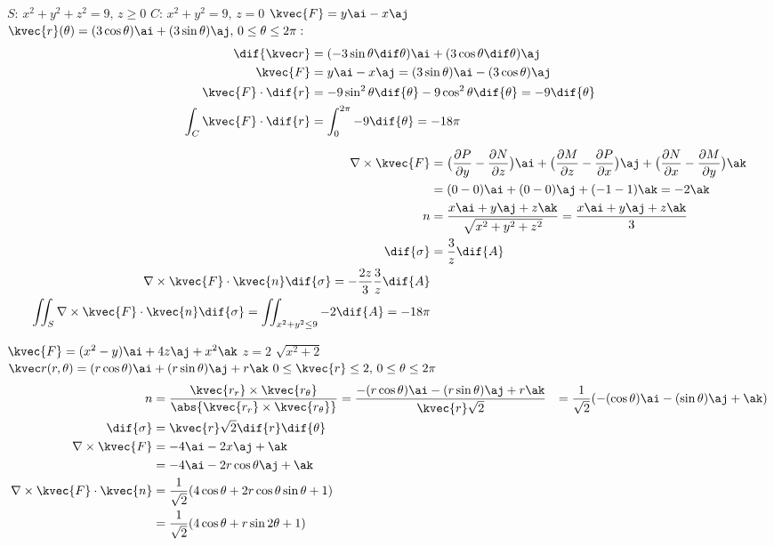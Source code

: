 \(S:\,x^{2}+y^{2}+z^{2}=9,\,z\ge 0\)
\(C:\,x^{2}+y^{2}=9,\,z=0\)
\(\kvec{F}=y\ai-x\aj\)\\
\(\kvec{r}(\theta)=(3\cos \theta)\ai+(3\sin \theta)\aj,\,0\le \theta\le 2\pi:\)\\

\begin{align*}
\dif{\kvec r}&=(-3\sin \theta\dif\theta)\ai+(3\cos \theta\dif\theta)\aj\\
\kvec{F}&=y\ai-x\aj=(3\sin \theta)\ai-(3\cos \theta)\aj\\
\kvec{F}\cdot\dif{r}&=-9\sin ^{2}\theta\dif{\theta}-9\cos ^{2}\theta\dif{\theta}=-9\dif{\theta}\\
\int_{C}\kvec{F}\cdot\dif{r}&=\int_{0}^{2\pi}-9\dif{\theta}=-18\pi
\end{align*}


\begin{align*}
\nabla\times\kvec{F}&=\big(\frac{\partial P}{\partial y}-\frac{\partial N}{\partial z}\big)\ai+\big(\frac{\partial M}{\partial z}-\frac{\partial P}{\partial x}\big)\aj+\big(\frac{\partial N}{\partial x}-\frac{\partial M}{\partial y}\big)\ak\\
&=(0-0)\ai+(0-0)\aj+(-1-1)\ak=-2\ak\\
n&=\frac{x\ai+y\aj+z\ak}{\sqrt{x^{2}+y^{2}+z^{2}}}=\frac{x\ai+y\aj+z\ak}{3}\\
\dif{\sigma}&=\frac{3}{z}\dif{A}\\
\nabla\times\kvec{F}\cdot\kvec{n}\dif{\sigma}=-\frac{2z}{3}\frac{3}{z}\dif{A}\\
\iint_{S}\nabla\times\kvec{F}\cdot\kvec{n}\dif{\sigma}=\iint_{x^{2}+y^{2}\le 9}-2\dif{A}=-18\pi
\end{align*}


\(\kvec {F}=(x^{2}-y)\ai+4z\aj+x^{2}\ak\)
\(z=2\)
\(\sqrt{x^{2}+{2}}\)\\
\(\kvec r(r,\theta)=(r\cos \theta)\ai+(r\sin \theta)\aj+r\ak\,\,0\le \kvec{r}\le 2,\,0\le \theta\le 2\pi\)
\begin{align*}
n&=\frac{\kvec{r_r}\times\kvec{r_\theta}}{\abs{\kvec{r_r}\times\kvec{r_\theta}}}=\frac{-(r\cos \theta)\ai-(r\sin \theta)\aj+r\ak}{\kvec{r}\sqrt{2}}
&=\frac{1}{\sqrt{2}}(-(\cos \theta)\ai-(\sin \theta)\aj+\ak)\\
\dif{\sigma}&=\kvec{r}\sqrt{2}\dif{r}\dif{\theta}\\
\nabla\times\kvec{F}&=-4\ai-2x\aj+\ak\\
&=-4\ai-2r\cos \theta\aj+\ak\\
\nabla\times\kvec{F}\cdot\kvec{n}&=\frac{1}{\sqrt{2}}(4\cos \theta+2r\cos \theta\sin \theta+1)\\
&=\frac{1}{\sqrt{2}}(4\cos \theta+r\sin 2\theta+1)
\end{align*}

